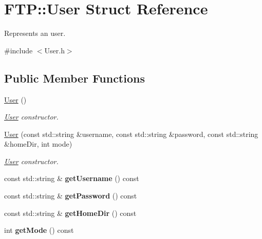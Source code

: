 \hypertarget{structFTP_1_1User}{}\section{F\+T\+P\+:\+:User Struct Reference}
\label{structFTP_1_1User}


Represents an user.  




{\ttfamily \#include $<$User.\+h$>$}

\subsection*{Public Member Functions}
\begin{DoxyCompactItemize}
\item 
\hypertarget{structFTP_1_1User_a1c8caf1199845f651ed9c2e259425af7}{}\hyperlink{structFTP_1_1User_a1c8caf1199845f651ed9c2e259425af7}{User} ()\label{structFTP_1_1User_a1c8caf1199845f651ed9c2e259425af7}

\begin{DoxyCompactList}\small\item\em \hyperlink{structFTP_1_1User}{User} constructor. \end{DoxyCompactList}\item 
\hyperlink{structFTP_1_1User_a9935dc6d5520daa68c4c03109723c9f2}{User} (const std\+::string \&username, const std\+::string \&password, const std\+::string \&home\+Dir, int mode)
\begin{DoxyCompactList}\small\item\em \hyperlink{structFTP_1_1User}{User} constructor. \end{DoxyCompactList}\item 
\hypertarget{structFTP_1_1User_a2de8d6c570a2b686eb751988a61fa80a}{}const std\+::string \& {\bfseries get\+Username} () const \label{structFTP_1_1User_a2de8d6c570a2b686eb751988a61fa80a}

\item 
\hypertarget{structFTP_1_1User_ae160530513b0c797a0c8c73ce3ad7349}{}const std\+::string \& {\bfseries get\+Password} () const \label{structFTP_1_1User_ae160530513b0c797a0c8c73ce3ad7349}

\item 
\hypertarget{structFTP_1_1User_a01a8869fd116660896b5fe91233719b1}{}const std\+::string \& {\bfseries get\+Home\+Dir} () const \label{structFTP_1_1User_a01a8869fd116660896b5fe91233719b1}

\item 
\hypertarget{structFTP_1_1User_abc8ec6b66316c4635d3afa42253826bc}{}int {\bfseries get\+Mode} () const \label{structFTP_1_1User_abc8ec6b66316c4635d3afa42253826bc}

\end{DoxyCompactItemize}
